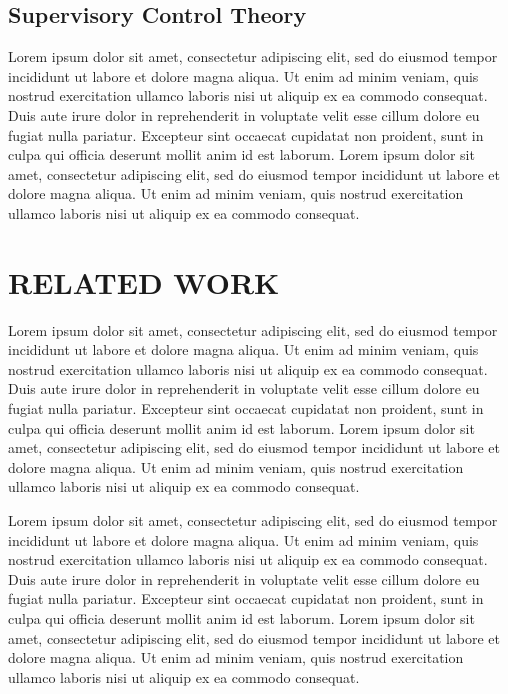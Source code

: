 \documentclass[letterpaper, 10 pt, conference]{ieeeconf}  %
\begin{document}
\subsection{Supervisory Control Theory}
Lorem ipsum dolor sit amet, consectetur adipiscing elit, sed do eiusmod tempor incididunt ut labore et dolore magna aliqua. Ut enim ad minim veniam, quis nostrud exercitation ullamco laboris nisi ut aliquip ex ea commodo consequat. Duis aute irure dolor in reprehenderit in voluptate velit esse cillum dolore eu fugiat nulla pariatur. Excepteur sint occaecat cupidatat non proident, sunt in culpa qui officia deserunt mollit anim id est laborum. Lorem ipsum dolor sit amet, consectetur adipiscing elit, sed do eiusmod tempor incididunt ut labore et dolore magna aliqua. Ut enim ad minim veniam, quis nostrud exercitation ullamco laboris nisi ut aliquip ex ea commodo consequat. 

\section{RELATED WORK}
Lorem ipsum dolor sit amet, consectetur adipiscing elit, sed do eiusmod tempor incididunt ut labore et dolore magna aliqua. Ut enim ad minim veniam, quis nostrud exercitation ullamco laboris nisi ut aliquip ex ea commodo consequat. Duis aute irure dolor in reprehenderit in voluptate velit esse cillum dolore eu fugiat nulla pariatur. Excepteur sint occaecat cupidatat non proident, sunt in culpa qui officia deserunt mollit anim id est laborum. Lorem ipsum dolor sit amet, consectetur adipiscing elit, sed do eiusmod tempor incididunt ut labore et dolore magna aliqua. Ut enim ad minim veniam, quis nostrud exercitation ullamco laboris nisi ut aliquip ex ea commodo consequat. 

Lorem ipsum dolor sit amet, consectetur adipiscing elit, sed do eiusmod tempor incididunt ut labore et dolore magna aliqua. Ut enim ad minim veniam, quis nostrud exercitation ullamco laboris nisi ut aliquip ex ea commodo consequat. Duis aute irure dolor in reprehenderit in voluptate velit esse cillum dolore eu fugiat nulla pariatur. Excepteur sint occaecat cupidatat non proident, sunt in culpa qui officia deserunt mollit anim id est laborum. Lorem ipsum dolor sit amet, consectetur adipiscing elit, sed do eiusmod tempor incididunt ut labore et dolore magna aliqua. Ut enim ad minim veniam, quis nostrud exercitation ullamco laboris nisi ut aliquip ex ea commodo consequat. 
\end{document}
